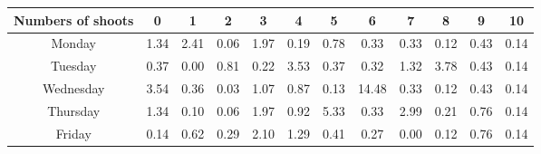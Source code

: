 \documentclass[a4paper]{article}
\begin{document}
\begin{table}[!htbp]
  \centering
    \begin{tabular}{|c|c|c|c|c|c|c|c|c|c|c|c|}
    \hline
    \rowcolor[rgb]{ .867,  .922,  .969} Numbers of shoots & 0     & 1     & 2     & 3     & 4     & 5     & 6     & 7     & 8     & 9     & 10 \\
    \hline
    \rowcolor[rgb]{ .867,  .922,  .969} Monday & \cellcolor[rgb]{ 1,  1,  1}1.34  & \cellcolor[rgb]{ 1,  1,  1}2.41  & \cellcolor[rgb]{ 1,  1,  1}0.06  & \cellcolor[rgb]{ 1,  1,  1}1.97  & \cellcolor[rgb]{ 1,  1,  1}0.19  & \cellcolor[rgb]{ 1,  1,  1}0.78  & \cellcolor[rgb]{ 1,  1,  1}0.33  & \cellcolor[rgb]{ 1,  1,  1}0.33  & \cellcolor[rgb]{ 1,  1,  1}0.12  & \cellcolor[rgb]{ 1,  1,  1}0.43  & \cellcolor[rgb]{ 1,  1,  1}0.14  \\
    \hline
    \rowcolor[rgb]{ .867,  .922,  .969} Tuesday & \cellcolor[rgb]{ 1,  1,  1}0.37  & \cellcolor[rgb]{ 1,  1,  1}0.00  & \cellcolor[rgb]{ 1,  1,  1}0.81  & \cellcolor[rgb]{ 1,  1,  1}0.22  & \cellcolor[rgb]{ 1,  1,  1}3.53  & \cellcolor[rgb]{ 1,  1,  1}0.37  & \cellcolor[rgb]{ 1,  1,  1}0.32  & \cellcolor[rgb]{ 1,  1,  1}1.32  & \cellcolor[rgb]{ 1,  1,  1}3.78  & \cellcolor[rgb]{ 1,  1,  1}0.43  & \cellcolor[rgb]{ 1,  1,  1}0.14  \\
    \hline
    \rowcolor[rgb]{ .867,  .922,  .969} Wednesday & \cellcolor[rgb]{ 1,  1,  1}3.54  & \cellcolor[rgb]{ 1,  1,  1}0.36  & \cellcolor[rgb]{ 1,  1,  1}0.03  & \cellcolor[rgb]{ 1,  1,  1}1.07  & \cellcolor[rgb]{ 1,  1,  1}0.87  & \cellcolor[rgb]{ 1,  1,  1}0.13  & \cellcolor[rgb]{ 1,  1,  1}14.48  & \cellcolor[rgb]{ 1,  1,  1}0.33  & \cellcolor[rgb]{ 1,  1,  1}0.12  & \cellcolor[rgb]{ 1,  1,  1}0.43  & \cellcolor[rgb]{ 1,  1,  1}0.14  \\
    \hline
    \rowcolor[rgb]{ .867,  .922,  .969} Thursday & \cellcolor[rgb]{ 1,  1,  1}1.34  & \cellcolor[rgb]{ 1,  1,  1}0.10  & \cellcolor[rgb]{ 1,  1,  1}0.06  & \cellcolor[rgb]{ 1,  1,  1}1.97  & \cellcolor[rgb]{ 1,  1,  1}0.92  & \cellcolor[rgb]{ 1,  1,  1}5.33  & \cellcolor[rgb]{ 1,  1,  1}0.33  & \cellcolor[rgb]{ 1,  1,  1}2.99  & \cellcolor[rgb]{ 1,  1,  1}0.21  & \cellcolor[rgb]{ 1,  1,  1}0.76  & \cellcolor[rgb]{ 1,  1,  1}0.14  \\
    \hline
    \rowcolor[rgb]{ .867,  .922,  .969} Friday & \cellcolor[rgb]{ 1,  1,  1}0.14  & \cellcolor[rgb]{ 1,  1,  1}0.62  & \cellcolor[rgb]{ 1,  1,  1}0.29  & \cellcolor[rgb]{ 1,  1,  1}2.10  & \cellcolor[rgb]{ 1,  1,  1}1.29  & \cellcolor[rgb]{ 1,  1,  1}0.41  & \cellcolor[rgb]{ 1,  1,  1}0.27  & \cellcolor[rgb]{ 1,  1,  1}0.00  & \cellcolor[rgb]{ 1,  1,  1}0.12  & \cellcolor[rgb]{ 1,  1,  1}0.76  & \cellcolor[rgb]{ 1,  1,  1}0.14  \\

\end{tabular}
\end{table}
\end{document}
